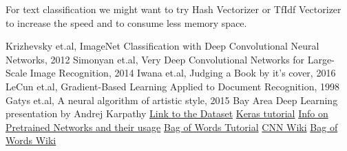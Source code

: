 \documentclass[conference]{IEEEtran}
\begin{document}
For text classification we might want to try Hash Vectorizer or TfIdf Vectorizer to increase the speed and to consume less memory space.
\begin{thebibliography}{00}
 Krizhevsky et.al, ImageNet Classification with Deep Convolutional Neural Networks, 2012 
 Simonyan et.al, Very Deep Convolutional Networks for Large-Scale Image Recognition, 2014 
 Iwana et.al, Judging a Book by it’s cover, 2016 
 LeCun et.al, Gradient-Based Learning Applied to Document Recognition, 1998 
 Gatys et.al, A neural algorithm of artistic style, 2015
 Bay Area Deep Learning presentation by Andrej Karpathy
 \href{https://github.com/uchidalab/book-dataset}{Link to the Dataset}
 \href{https://blog.keras.io/building-powerful-image-classification-models-using-very-little-data.html}{Keras tutorial}
 \href{https://keras.io/applications/}{Info on Pretrained Networks and their usage}
 \href{https://machinelearningmastery.com/gentle-introduction-bag-words-model/}{Bag of Words Tutorial} 
 \href{https://en.wikipedia.org/wiki/Convolutional\_neural\_network}{CNN Wiki}
 \href{https://en.wikipedia.org/wiki/Bag-of-words\_model}{Bag of Words Wiki}
\end{thebibliography}
\end{document}
